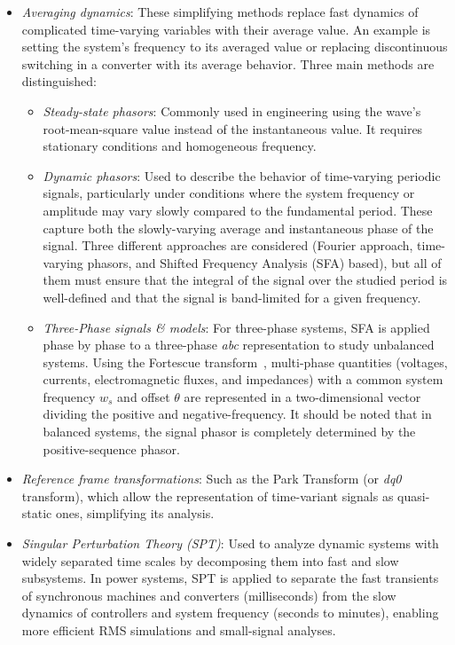 \begin{itemize}
    \item \textit{Averaging dynamics}: These simplifying methods replace fast dynamics of complicated time-varying variables with their average value. 
    An example is setting the system's frequency to its averaged value or replacing discontinuous switching in a converter with its average behavior. 
    Three main methods are distinguished:
    \begin{itemize}
        \item \textit{Steady-state phasors}: Commonly used in engineering using the wave's root-mean-square value instead of the instantaneous value. 
        It requires stationary conditions and homogeneous frequency.
        \item \textit{Dynamic phasors}: Used to describe the behavior of time-varying periodic signals, particularly under conditions where the system frequency 
        or amplitude may vary slowly compared to the fundamental period. These capture both the slowly-varying average and instantaneous phase of the signal. 
        Three different approaches are considered (Fourier approach, time-varying phasors, and Shifted Frequency Analysis (SFA) based), 
        but all of them must ensure that the integral of the signal over the studied period is well-defined and that the signal is band-limited for a given frequency.
        \item \textit{Three-Phase signals \& models}: For three-phase systems, SFA is applied phase by phase to a three-phase \textit{abc} representation to study unbalanced systems. 
        Using the Fortescue transform~\cite{Fortescue}, multi-phase quantities (voltages, currents, electromagnetic fluxes, and impedances) with a common system frequency $w_s$ 
        and offset $\theta$ are represented in a two-dimensional vector dividing the positive and negative-frequency. 
        It should be noted that in balanced systems, the signal phasor is completely determined by the positive-sequence phasor.
    \end{itemize}

    \item \textit{Reference frame transformations}: Such as the Park Transform (or \textit{dq0} transform), which allow the representation of time-variant signals as quasi-static ones, simplifying its analysis.

    \item \textit{Singular Perturbation Theory (SPT)}: Used to analyze dynamic systems with widely separated time scales by decomposing them into fast and slow subsystems. 
    In power systems, SPT is applied to separate the fast transients of synchronous machines and converters (milliseconds) from the slow dynamics of controllers 
    and system frequency (seconds to minutes), enabling more efficient RMS simulations and small-signal analyses.
\end{itemize}


